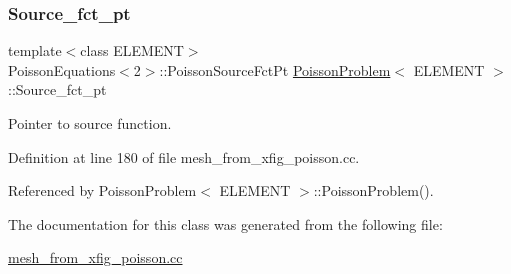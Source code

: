 \subsubsection{\texorpdfstring{Source\+\_\+fct\+\_\+pt}{Source\_fct\_pt}}
{\footnotesize\ttfamily template$<$class E\+L\+E\+M\+E\+NT$>$ \\
Poisson\+Equations$<$2$>$\+::Poisson\+Source\+Fct\+Pt \hyperlink{classPoissonProblem}{Poisson\+Problem}$<$ E\+L\+E\+M\+E\+NT $>$\+::Source\+\_\+fct\+\_\+pt\hspace{0.3cm}{\ttfamily [private]}}



Pointer to source function. 



Definition at line 180 of file mesh\+\_\+from\+\_\+xfig\+\_\+poisson.\+cc.



Referenced by Poisson\+Problem$<$ E\+L\+E\+M\+E\+N\+T $>$\+::\+Poisson\+Problem().



The documentation for this class was generated from the following file\+:\begin{DoxyCompactItemize}
\item 
\hyperlink{mesh__from__xfig__poisson_8cc}{mesh\+\_\+from\+\_\+xfig\+\_\+poisson.\+cc}\end{DoxyCompactItemize}
